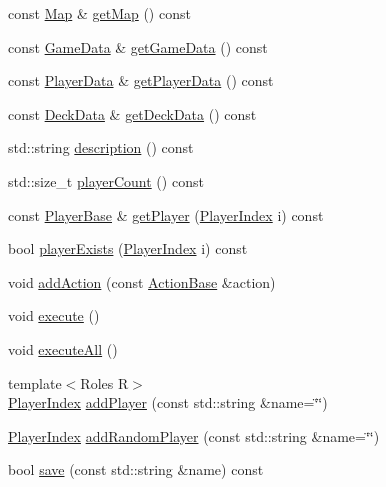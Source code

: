 \begin{DoxyCompactItemize}
const \hyperlink{classpan_1_1_map}{Map} \& \hyperlink{classpan_1_1_game_a8700fef57be33a7388ef9532dcb30f0c}{get\+Map} () const
\item 
const \hyperlink{structpan_1_1_game_data}{Game\+Data} \& \hyperlink{classpan_1_1_game_a79be06abcb20bc30cc825f8a781d3575}{get\+Game\+Data} () const
\item 
const \hyperlink{structpan_1_1_player_data}{Player\+Data} \& \hyperlink{classpan_1_1_game_a97050486b97c861c3d9d684bc95f0454}{get\+Player\+Data} () const
\item 
const \hyperlink{structpan_1_1_deck_data}{Deck\+Data} \& \hyperlink{classpan_1_1_game_a0fcbd5cc3e1fe836915356478d781fc4}{get\+Deck\+Data} () const
\item 
std\+::string \hyperlink{classpan_1_1_game_a463480ea3f29b34629059134c416ffa0}{description} () const
\item 
std\+::size\+\_\+t \hyperlink{classpan_1_1_game_abd867b6b03f12c8b3aa8ccaef62a9cce}{player\+Count} () const
\item 
const \hyperlink{classpan_1_1_player_base}{Player\+Base} \& \hyperlink{classpan_1_1_game_a23838df4cde7e8be5273ec5de03c152d}{get\+Player} (\hyperlink{namespacepan_a0cdabf874fbf1bb3a1f0152d108c2909}{Player\+Index} i) const
\item 
bool \hyperlink{classpan_1_1_game_aaefd820a874069810f2e62a2d50068e1}{player\+Exists} (\hyperlink{namespacepan_a0cdabf874fbf1bb3a1f0152d108c2909}{Player\+Index} i) const
\item 
void \hyperlink{classpan_1_1_game_a4bcb881db3acea9a02d6ff3ac6e7b209}{add\+Action} (const \hyperlink{classpan_1_1_action_base}{Action\+Base} \&action)
\item 
void \hyperlink{classpan_1_1_game_ad252b2f2c65beb9584ab63d96787fed7}{execute} ()
\item 
void \hyperlink{classpan_1_1_game_a19a92963216ec73c0718cab214f89e85}{execute\+All} ()
\item 
{\footnotesize template$<$Roles R$>$ }\\\hyperlink{namespacepan_a0cdabf874fbf1bb3a1f0152d108c2909}{Player\+Index} \hyperlink{classpan_1_1_game_a0a475cd974dc0de461f7fabc80ab9dce}{add\+Player} (const std\+::string \&name=\char`\"{}\char`\"{})
\item 
\hyperlink{namespacepan_a0cdabf874fbf1bb3a1f0152d108c2909}{Player\+Index} \hyperlink{classpan_1_1_game_adce8b415591cac36cf8f39602f0736c4}{add\+Random\+Player} (const std\+::string \&name=\char`\"{}\char`\"{})
\item 
bool \hyperlink{classpan_1_1_game_a3ed8021afce3a331ede74826bf9742b6}{save} (const std\+::string \&name) const
\end{DoxyCompactItemize}
